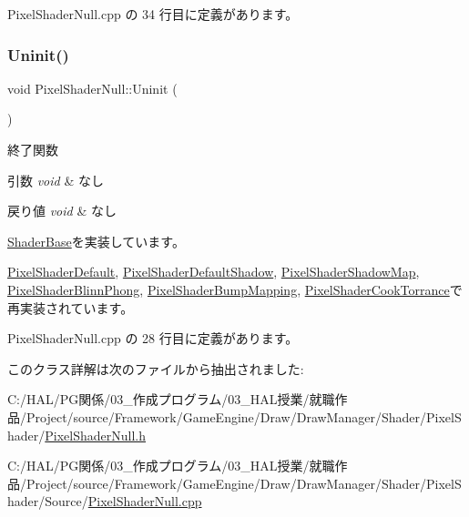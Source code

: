  Pixel\+Shader\+Null.\+cpp の 34 行目に定義があります。

\mbox{\label{class_pixel_shader_null_adca4c44cd25c90a5ebd75b459f5e641e}} 
\subsubsection{\texorpdfstring{Uninit()}{Uninit()}}
{\footnotesize\ttfamily void Pixel\+Shader\+Null\+::\+Uninit (\begin{DoxyParamCaption}{ }\end{DoxyParamCaption})\hspace{0.3cm}{\ttfamily [virtual]}}



終了関数 


\begin{DoxyParams}{引数}
{\em void} & なし \\
\hline
\end{DoxyParams}

\begin{DoxyRetVals}{戻り値}
{\em void} & なし \\
\hline
\end{DoxyRetVals}


\mbox{\hyperlink{class_shader_base_a784edfa81bec4d08a257ed4f02c61222}{Shader\+Base}}を実装しています。



\mbox{\hyperlink{class_pixel_shader_default_af195bc2ba2e5f7352d4b762b20825d95}{Pixel\+Shader\+Default}}, \mbox{\hyperlink{class_pixel_shader_default_shadow_abd9b03c980fed91c4fc14bbab244adbd}{Pixel\+Shader\+Default\+Shadow}}, \mbox{\hyperlink{class_pixel_shader_shadow_map_aa95a200a1bf5bd91ffaa526a647818f1}{Pixel\+Shader\+Shadow\+Map}}, \mbox{\hyperlink{class_pixel_shader_blinn_phong_a50450f0ad9c6c0ad011361ee153088af}{Pixel\+Shader\+Blinn\+Phong}}, \mbox{\hyperlink{class_pixel_shader_bump_mapping_a004f731db6dab6b59949baed4a5a32d7}{Pixel\+Shader\+Bump\+Mapping}}, \mbox{\hyperlink{class_pixel_shader_cook_torrance_af2af86383b1724d1bf1364533a07fc5a}{Pixel\+Shader\+Cook\+Torrance}}で再実装されています。



 Pixel\+Shader\+Null.\+cpp の 28 行目に定義があります。



このクラス詳解は次のファイルから抽出されました\+:\begin{DoxyCompactItemize}
\item 
C\+:/\+H\+A\+L/\+P\+G関係/03\+\_\+作成プログラム/03\+\_\+\+H\+A\+L授業/就職作品/\+Project/source/\+Framework/\+Game\+Engine/\+Draw/\+Draw\+Manager/\+Shader/\+Pixel\+Shader/\mbox{\hyperlink{_pixel_shader_null_8h}{Pixel\+Shader\+Null.\+h}}\item 
C\+:/\+H\+A\+L/\+P\+G関係/03\+\_\+作成プログラム/03\+\_\+\+H\+A\+L授業/就職作品/\+Project/source/\+Framework/\+Game\+Engine/\+Draw/\+Draw\+Manager/\+Shader/\+Pixel\+Shader/\+Source/\mbox{\hyperlink{_pixel_shader_null_8cpp}{Pixel\+Shader\+Null.\+cpp}}\end{DoxyCompactItemize}
